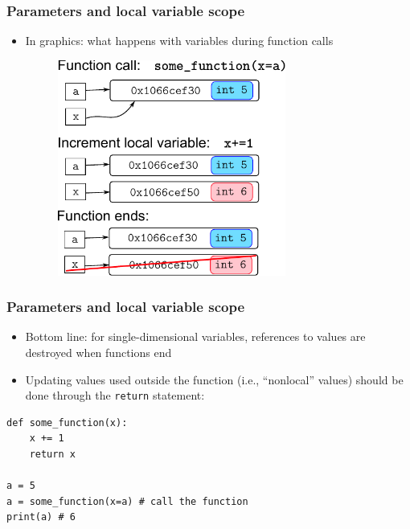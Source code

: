 \documentclass[xcolor=table]{beamer}
\begin{document}
    \begin{frame}[fragile]
\frametitle{Parameters and local variable scope}
        \begin{itemize}
            \item In graphics: what happens with variables during function calls
        \begin{figure}\centering%
            \vspace{1ex}%
            \includegraphics[width = 75mm]{functionParameters.pdf}
        \end{figure}
    \end{itemize}
\end{frame}

\begin{frame}[fragile]
\frametitle{Parameters and local variable scope}
    \begin{itemize}
        \item Bottom line: for single-dimensional variables, references to values are destroyed when functions end \pause
        \item<2->Updating values used outside the function (i.e., ``nonlocal'' values) should be done through the \texttt{return} statement: \pause
    \end{itemize}
\begin{lstlisting}[style=python]
def some_function(x):  
    x += 1 
    return x

a = 5 
a = some_function(x=a) # call the function
print(a) # 6
\end{lstlisting}
\end{frame}
\end{document}
